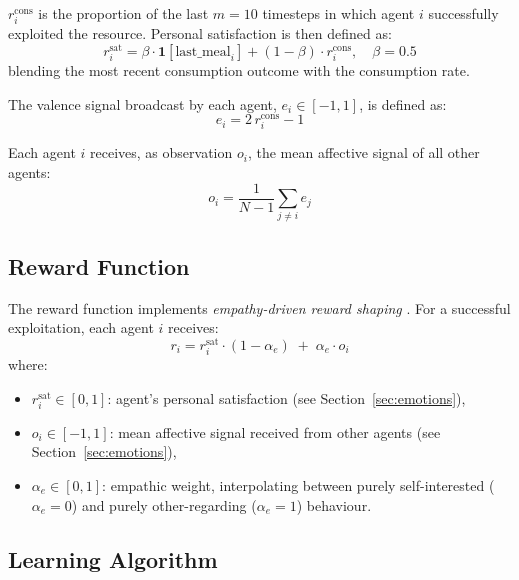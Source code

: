 $r_i^{\text{cons}}$ is the proportion of the last $m = 10$
timesteps in which agent $i$ successfully exploited the resource. Personal satisfaction is
then defined as:
\begin{equation}
    r_i^{\text{sat}} = \beta \cdot \mathbf{1}[\text{last\_meal}_i]
                     + (1 - \beta) \cdot r_i^{\text{cons}}, \quad \beta = 0.5
\end{equation}
blending the most recent consumption outcome with the consumption rate.

The valence signal broadcast by each agent, $e_i \in [-1, 1]$, is defined as:
\begin{equation}
    e_i = 2\,r_i^{\text{cons}} - 1
\end{equation}

Each agent $i$ receives, as observation $o_i$, the mean affective signal
of all other agents:
\begin{equation}
    o_i = \frac{1}{N-1}\sum_{j \neq i} e_j
\end{equation}

\subsection{Reward Function}
\label{sec:reward}

The reward function implements \emph{empathy-driven reward shaping}
\cite{lynneTheoreticalFoundationEmpathy2016}. For a successful exploitation, each agent $i$ receives:
\begin{equation}
    r_i = r_i^{\text{sat}} \cdot (1 - \alpha_e) \;+\; \alpha_e \cdot o_i
\end{equation}
where:
\begin{itemize}
    \item $r_i^{\text{sat}} \in [0, 1]$: agent's personal satisfaction
          (see Section~\ref{sec:emotions}),
    \item $o_i \in [-1, 1]$: mean affective signal received from other agents
          (see Section~\ref{sec:emotions}),
    \item $\alpha_e \in [0, 1]$: empathic weight, interpolating between
          purely self-interested ($\alpha_e = 0$) and purely
          other-regarding ($\alpha_e = 1$) behaviour.
\end{itemize}

\subsection{Learning Algorithm}

